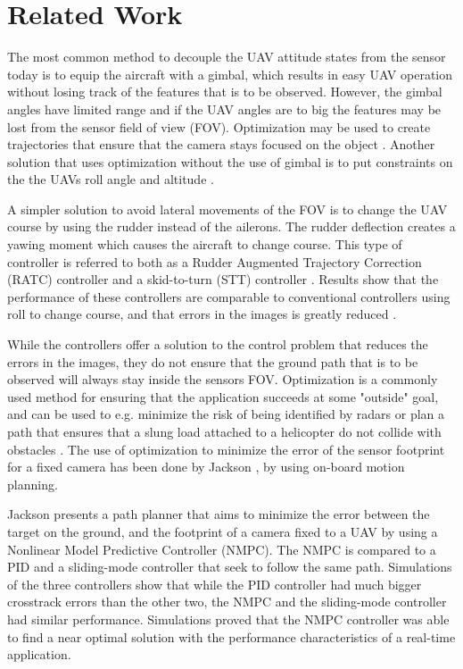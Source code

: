 \section{Related Work}

The most common method to decouple the UAV attitude states from the sensor today is to equip the aircraft with a gimbal, which results in easy UAV operation without losing track of the features that is to be observed. However, the gimbal angles have limited range and if the UAV angles are to big the features may be lost from the sensor field of view (FOV). Optimization may be used to create trajectories that ensure that the camera stays focused on the object \cite{nundalSKJONG}. Another solution that uses optimization without the use of gimbal is to put constraints on the the UAVs roll angle and altitude \cite{constraintsEGBERT}.

A simpler solution to avoid lateral movements of the FOV is to change the UAV course by using the rudder instead of the ailerons. The rudder deflection creates a yawing moment \cite{ratcFISHER} which causes the aircraft to change course. This type of controller is referred to both as a Rudder Augmented Trajectory Correction (RATC) controller \cite{ratcFISHER} and a skid-to-turn (STT) controller \cite{skidMILLS}. Results show that the performance of these controllers are comparable to conventional controllers using roll to change course, and that errors in the images is greatly reduced \cite{ratcFISHER}\cite{skidMILLS}\cite{alternateAHSAN}.

While the controllers offer a solution to the control problem that reduces the errors in the images, they do not ensure that the ground path that is to be observed will always stay inside the sensors FOV. Optimization is a commonly used method for ensuring that the application succeeds at some "outside" goal, and can be used to e.g. minimize the risk of being identified by radars \cite{radarINANC} or plan a path that ensures that a slung load attached to a helicopter do not collide with obstacles \cite{slungANDERSLACOUR}. The use of optimization to minimize the error of the sensor footprint for a fixed camera has been done by Jackson \cite{optimJACKSON}, by using on-board motion planning.

Jackson presents a path planner that aims to minimize the error between the target on the ground, and the footprint of a camera fixed to a UAV by using a Nonlinear Model Predictive Controller (NMPC). The NMPC is compared to a PID and a sliding-mode controller that seek to follow the same path. Simulations of the three controllers show that while the PID controller had much bigger crosstrack errors than the other two, the NMPC and the sliding-mode controller had similar performance. Simulations proved that the NMPC controller was able to find a near optimal solution with the performance characteristics of a real-time application.

